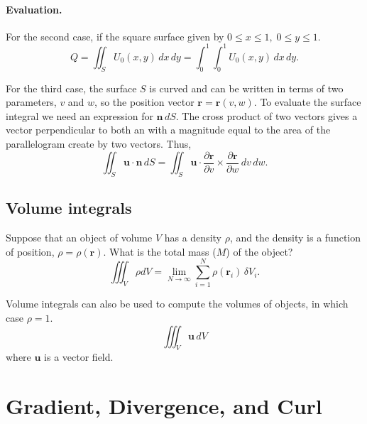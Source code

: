\paragraph{Evaluation. }
For the second case, if  the square surface given by 
$0 \leq x \leq 1, \; 0 \leq y \leq 1$.
\begin{equation}
    Q = \iint_S U_0(x,y) \, dx\,dy 
      = \int^1_0 \int^1_0 U_0(x,y) \, dx\,dy.
\end{equation}

For the third case, the surface $S$ is curved and can be written in terms of two parameters, $v$ and $w$, so the position vector $\bm{r} = \bm{r}(v,w)$. 
To evaluate the surface integral we need an expression for $\bm{n} \, dS$. 
The cross product of two vectors gives a vector perpendicular to both an with a magnitude equal to the area of the parallelogram create by two vectors. 
Thus, 
\begin{equation}
    \iint_S \bm{u} \cdot \bm{n} \, dS
    = \iint_S \bm{u} \cdot 
    \frac{\partial \bm{r}}{\partial v} \times \frac{\partial \bm{r}}{\partial w} \, dv \, dw.
\end{equation}

\subsection{Volume integrals}
\begin{example}
    Suppose that an object of volume $V$ has a density $\rho$, and the density is a function of position, $\rho = \rho (\bm{r})$.
    What is the total mass ($M$) of the object?
    \begin{equation}
        \iiint_V \rho dV 
        = \lim_{N\to \infty} \sum^N_{i=1} \rho(\bm{r}_i)\,\delta V_i.
    \end{equation}

    Volume integrals can also be used to compute the volumes of objects, in which case $\rho =1$.
    \begin{equation}
        \iiint_V \bm{u} \, dV
    \end{equation}
    where $\bm{u}$ is a vector field.
\end{example}

\section{Gradient, Divergence, and Curl}
